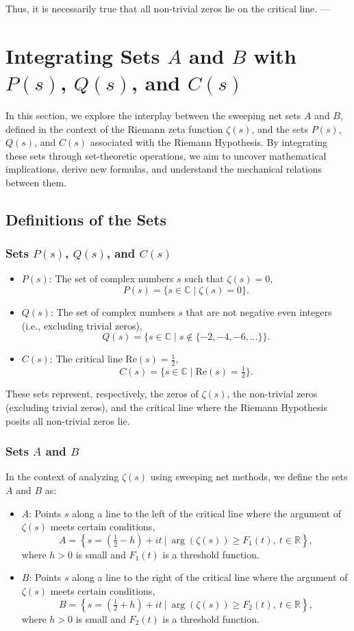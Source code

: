 \documentclass{article}
\begin{document}
\[\] Thus, it is necessarily true that all non-trivial zeros lie on the critical line. --- \section{Integrating Sets $A$ and $B$ with $P(s)$, $Q(s)$, and $C(s)$} In this section, we explore the interplay between the sweeping net sets $A$ and $B$, defined in the context of the Riemann zeta function $\zeta(s)$, and the sets $P(s)$, $Q(s)$, and $C(s)$ associated with the Riemann Hypothesis. By integrating these sets through set-theoretic operations, we aim to uncover mathematical implications, derive new formulas, and understand the mechanical relations between them. \subsection{Definitions of the Sets} \subsubsection{Sets $P(s)$, $Q(s)$, and $C(s)$} \begin{itemize} \item \textbf{$P(s)$}: The set of complex numbers $s$ such that $\zeta(s) = 0$, \[ P(s) = \{ s \in \mathbb{C} \mid \zeta(s) = 0 \}. \] \item \textbf{$Q(s)$}: The set of complex numbers $s$ that are not negative even integers (i.e., excluding trivial zeros), \[ Q(s) = \{ s \in \mathbb{C} \mid s \notin \{ -2, -4, -6, \ldots \} \}. \] \item \textbf{$C(s)$}: The critical line $\mathrm{Re}(s) = \tfrac{1}{2}$, \[ C(s) = \{ s \in \mathbb{C} \mid \mathrm{Re}(s) = \tfrac{1}{2} \}. \]
\end{itemize} These sets represent, respectively, the zeros of $\zeta(s)$, the non-trivial zeros (excluding trivial zeros), and the critical line where the Riemann Hypothesis posits all non-trivial zeros lie. \subsubsection{Sets $A$ and $B$} In the context of analyzing $\zeta(s)$ using sweeping net methods, we define the sets $A$ and $B$ as: \begin{itemize} \item \textbf{$A$}: Points $s$ along a line to the left of the critical line where the argument of $\zeta(s)$ meets certain conditions, \[ A = \left\{ s = \left( \tfrac{1}{2} - h \right) + it \ \bigg| \ \arg\left( \zeta\left( s \right) \right) \geq F_1(t), \ t \in \mathbb{R} \right\}, \] where $h > 0$ is small and $F_1(t)$ is a threshold function. \item \textbf{$B$}: Points $s$ along a line to the right of the critical line where the argument of $\zeta(s)$ meets certain conditions, \[ B = \left\{ s = \left( \tfrac{1}{2} + h \right) + it \ \bigg| \ \arg\left( \zeta\left( s \right) \right) \geq F_2(t), \ t \in \mathbb{R} \right\}, \] where $h > 0$ is small and $F_2(t)$ is a threshold function.

\end{itemize}
\end{document}
